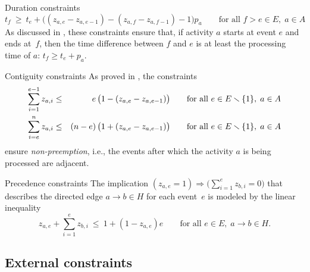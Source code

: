 \documentclass[11pt,reqno]{amsart}
\newcommand{\lra}{\longrightarrow}
\numberwithin{equation}{section}
\begin{document}
\begin{mydesc}
\item[Duration constraints]
  \begin{equation}
     t_f 
     \ \ge \
     t_e + \big((z_{a,e} - z_{a,e-1} ) - (z_{a,f} - z_{a,f-1}) - 1\big) p_a
     \qquad\text{for all } f>e\in E,\; a\in A
  \end{equation}
  As discussed in \cite{artigues-etal11}, these constraints ensure that,
if activity $a$ starts at event $e$ and ends at~$f$, then the time difference between  $f$
and $e$ is at least the processing time of $a$: $t_f \ge t_e + p_a$.

\item[Contiguity constraints] As proved in \cite[Proposition 1]{artigues-etal11a}, the
  constraints
  \begin{eqnarray}
    \sum_{i=1}^{e-1} z_{a,i}
    &\le&
    \phantom{(n-e)}\llap{$e$}\,\big(1-(z_{a,e} - z_{a,e-1})\big)
    \qquad\text{for all } e\in E\smallsetminus\{1\},\; a\in A
    \\
    \sum_{i=e}^n z_{a,i}
    &\le&
    (n-e)\,\big(1+(z_{a,e} - z_{a,e-1})\big)
    \qquad\text{for all } e\in E\smallsetminus\{1\},\; a\in A
  \end{eqnarray}
  ensure \emph{non-preemption}, i.e., the events after which the activity $a$ is being
  processed are adjacent.

\item[Precedence constraints] The implication $(z_{a,e}=1) \Longrightarrow
  \big(\sum_{i=1}^{e} z_{b,i}=0\big)$ that describes the directed edge $a\lra b\in H$ for
  each event~$e$ is modeled by the linear inequality
  \begin{equation}
     z_{a,e} + \sum_{i=1}^e z_{b,i}
     \ \le \
     1+(1-z_{a,e})e
     \qquad\text{for all } e\in E,\; a\lra b\in H.
  \end{equation}


\end{mydesc}
\newpage
\subsection{External constraints}
\end{document}
